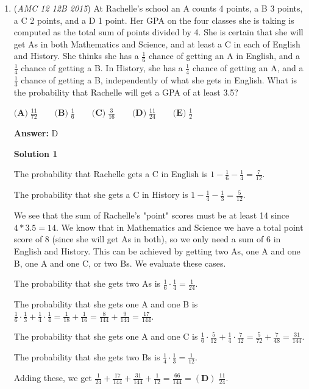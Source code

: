 \begin{enumerate}
 


	\item (\textit{AMC 12 12B 2015}) At Rachelle's school an A counts 4 points, a B 3 points, a C 2 points, and a D 1 point. Her GPA on the four classes she is taking is computed as the total sum of points divided by 4. She is certain that she will get As in both Mathematics and Science, and at least a C in each of English and History. She thinks she has a $\frac{1}{6}$ chance of getting an A in English, and a $\frac{1}{4}$ chance of getting a B. In History, she has a $\frac{1}{4}$ chance of getting an A, and a $\frac{1}{3}$ chance of getting a B, independently of what she gets in English. What is the probability that Rachelle will get a GPA of at least 3.5?


 $\textbf{(A)}\; \frac{11}{72} \qquad\textbf{(B)}\; \frac{1}{6} \qquad\textbf{(C)}\; \frac{3}{16} \qquad\textbf{(D)}\; \frac{11}{24} \qquad\textbf{(E)}\; \frac{1}{2}$

 \textbf{Answer: }D



\textbf{Solution 1}

The probability that Rachelle gets a C in English is $1-\frac{1}{6}-\frac{1}{4} = \frac{7}{12}$.

 The probability that she gets a C in History is $1-\frac{1}{4}-\frac{1}{3} = \frac{5}{12}$.

 We see that the sum of Rachelle's "point" scores must be at least 14 since $4*3.5 = 14$. We know that in Mathematics and Science we have a total point score of 8 (since she will get As in both), so we only need a sum of 6 in English and History. This can be achieved by getting two As, one A and one B, one A and one C, or two Bs. We evaluate these cases.

 The probability that she gets two As is $\frac{1}{6}\cdot\frac{1}{4} = \frac{1}{24}$.

 The probability that she gets one A and one B is $\frac{1}{6}\cdot\frac{1}{3} + \frac{1}{4}\cdot\frac{1}{4} = \frac{1}{18}+\frac{1}{16} =  \frac{8}{144}+\frac{9}{144} = \frac{17}{144}$.

 The probability that she gets one A and one C is $\frac{1}{6}\cdot\frac{5}{12} + \frac{1}{4}\cdot\frac{7}{12} = \frac{5}{72}+\frac{7}{48} =  \frac{31}{144}$.

 The probability that she gets two Bs is $\frac{1}{4}\cdot\frac{1}{3} = \frac{1}{12}$.

 Adding these, we get $\frac{1}{24} + \frac{17}{144} +  \frac{31}{144} + \frac{1}{12} = \frac{66}{144} = \boxed{\mathbf{(D)}\;  \frac{11}{24}}$.


\end{enumerate}
